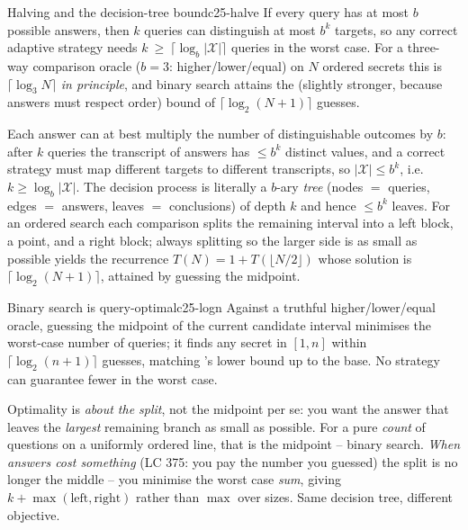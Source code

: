 \begin{proposition}{Halving and the decision-tree bound}{c25-halve}
If every query has at most $b$ possible answers, then $k$ queries can distinguish at most $b^{k}$
targets, so any correct adaptive strategy needs
$\displaystyle k\ \ge\ \lceil \log_{b} |\mathcal{X}| \rceil$ queries in the worst case. For a
three-way comparison oracle ($b=3$: higher/lower/equal) on $N$ ordered secrets this is
$\lceil\log_3 N\rceil$ \emph{in principle}, and binary search attains the (slightly stronger,
because answers must respect order) bound of $\lceil\log_2(N{+}1)\rceil$ guesses.
\end{proposition}
\begin{proofbox}
Each answer can at best multiply the number of distinguishable outcomes by $b$: after $k$ queries the
transcript of answers has $\le b^{k}$ distinct values, and a correct strategy must map different
targets to different transcripts, so $|\mathcal{X}|\le b^{k}$, i.e.\ $k\ge\log_b|\mathcal{X}|$. The
decision process is literally a $b$-ary \emph{tree} (nodes $=$ queries, edges $=$ answers, leaves $=$
conclusions) of depth $k$ and hence $\le b^{k}$ leaves. For an ordered search each comparison splits
the remaining interval into a left block, a point, and a right block; always splitting so the larger
side is as small as possible yields the recurrence $T(N)=1+T(\lfloor N/2\rfloor)$ whose solution is
$\lceil\log_2(N{+}1)\rceil$, attained by guessing the midpoint. \end{proofbox}

\begin{theorem}{Binary search is query-optimal}{c25-logn}
Against a truthful higher/lower/equal oracle, guessing the midpoint of the current candidate interval
minimises the worst-case number of queries; it finds any secret in $[1,n]$ within
$\lceil\log_2(n{+}1)\rceil$ guesses, matching 's lower bound up to the base. No
strategy can guarantee fewer in the worst case.
\end{theorem}
\begin{insightbox}
Optimality is \emph{about the split}, not the midpoint per se: you want the answer that leaves the
\emph{largest} remaining branch as small as possible. For a pure \emph{count} of questions on a
uniformly ordered line, that is the midpoint -- binary search. \emph{When answers cost something}
(LC 375: you pay the number you guessed) the split is no longer the middle -- you minimise the worst
case \emph{sum}, giving $k+\max(\text{left},\text{right})$ rather than $\max$ over sizes. Same
decision tree, different objective.
\end{insightbox}

